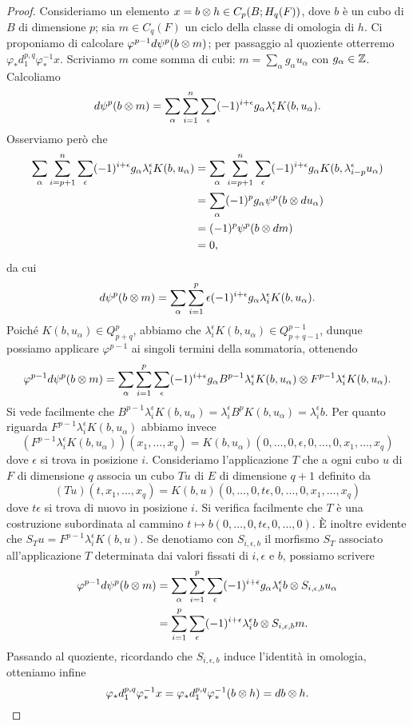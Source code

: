 \begin{proof}
Consideriamo un elemento $x=b\mathbin{\otimes} h\in C_p(B;H_q(F))$, dove $b$ è un cubo di $B$ di dimensione $p$; sia $m\in C_q(F)$ un ciclo della classe di omologia di $h$. Ci proponiamo di calcolare $\varphi^{p-1}d\psi^p(b\mathbin{\otimes} m)$; per passaggio al quoziente otterremo $\varphi_*d^{p,q}_1\varphi_*^{-1}x$. Scriviamo $m$ come somma di cubi: $m=\sum_{\alpha}g_\alpha u_\alpha$ con $g_\alpha\in\mathbb{Z}$. Calcoliamo
$$
d\psi^p(b\mathbin{\otimes} m)=\sum_\alpha\sum_{i=1}^n\sum_\epsilon(-1)^{i+\epsilon}g_\alpha\lambda^\epsilon_iK(b,u_\alpha).
$$
Osserviamo però che
\begin{align*}
\sum_\alpha\sum_{i=p+1}^n\sum_\epsilon(-1)^{i+\epsilon}g_\alpha\lambda^\epsilon_iK(b,u_\alpha)&=\sum_{\alpha}\sum_{i=p+1}^n\sum_\epsilon(-1)^{i+\epsilon}g_\alpha K(b,\lambda^\epsilon_{i-p}u_\alpha)\\
&=\sum_\alpha(-1)^pg_\alpha\psi^p(b\mathbin{\otimes} du_\alpha)\\
&=(-1)^p\psi^p(b\mathbin{\otimes} dm)\\
&=0,
\end{align*}
da cui
$$
d\psi^p(b\mathbin{\otimes} m)=\sum_\alpha\sum_{i=1}^p\epsilon(-1)^{i+\epsilon}g_\alpha\lambda^\epsilon_iK(b,u_\alpha).
$$
Poiché $K(b,u_\alpha)\in Q^p_{p+q}$, abbiamo che $\lambda^\epsilon_iK(b,u_\alpha)\in Q^{p-1}_{p+q-1}$, dunque possiamo applicare $\varphi^{p-1}$ ai singoli termini della sommatoria, ottenendo
$$
\varphi^{p-1}d\psi^p(b\mathbin{\otimes} m)=\sum_\alpha\sum_{i=1}^p\sum_\epsilon(-1)^{i+\epsilon}g_\alpha B^{p-1}\lambda^\epsilon_iK(b,u_\alpha)\mathbin{\otimes} F^{p-1}\lambda^\epsilon_iK(b,u_\alpha).
$$
Si vede facilmente che $B^{p-1}\lambda^{\epsilon}_iK(b,u_\alpha)=\lambda^\epsilon_i B^pK(b,u_\alpha)=\lambda^\epsilon_ib$. Per quanto riguarda $F^{p-1}\lambda^\epsilon_iK(b,u_\alpha)$ abbiamo invece
$$
(F^{p-1}\lambda^\epsilon_iK(b,u_\alpha))(x_1,\ldots,x_q)=K(b,u_\alpha)(0,\ldots,0,\epsilon,0,\ldots,0,x_1,\ldots,x_q)
$$
dove $\epsilon$ si trova in posizione $i$. Consideriamo l'applicazione $T$ che a ogni cubo $u$ di $F$ di dimensione $q$ associa un cubo $Tu$ di $E$ di dimensione $q+1$ definito da
$$
(Tu)(t,x_1,\ldots,x_q)=K(b,u)(0,\ldots,0,t\epsilon,0,\ldots,0,x_1,\ldots,x_q)
$$
dove $t\epsilon$ si trova di nuovo in posizione $i$. Si verifica facilmente che $T$ è una costruzione subordinata al cammino $t\mapsto b(0,\ldots,0,t\epsilon,0,\ldots,0)$. È inoltre evidente che $S_Tu=F^{p-1}\lambda^\epsilon_iK(b,u)$. Se denotiamo con $S_{i,\epsilon,b}$ il morfismo $S_T$ associato all'applicazione $T$ determinata dai valori fissati di $i,\epsilon$ e $b$, possiamo scrivere
\begin{align*}
\varphi^{p-1}d\psi^p(b\mathbin{\otimes} m)&=\sum_\alpha\sum_{i=1}^p\sum_\epsilon(-1)^{i+\epsilon}g_\alpha\lambda^\epsilon_ib\mathbin{\otimes} S_{i,\epsilon,b}u_\alpha\\
&=\sum_{i=1}^p\sum_\epsilon(-1)^{i+\epsilon}\lambda^\epsilon_ib\mathbin{\otimes} S_{i,\epsilon,b}m.
\end{align*}
Passando al quoziente, ricordando che $S_{i,\epsilon, b}$ induce l'identità in omologia, otteniamo infine
\[
\varphi_*d^{p,q}_1\varphi_*^{-1}x=\varphi_*d^{p,q}_1\varphi_*^{-1}(b\mathbin{\otimes} h)=db\mathbin{\otimes} h.\qedhere
\]
\end{proof}
